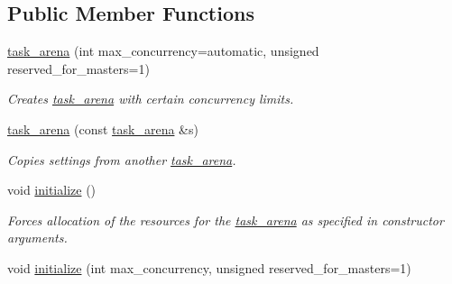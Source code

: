 \subsection*{Public Member Functions}
\begin{DoxyCompactItemize}
\item 
\hyperlink{classtbb_1_1interface7_1_1task__arena_a6035737ce1a8db376d06880dae9d0c40}{task\+\_\+arena} (int max\+\_\+concurrency=automatic, unsigned reserved\+\_\+for\+\_\+masters=1)
\begin{DoxyCompactList}\small\item\em Creates \hyperlink{classtbb_1_1interface7_1_1task__arena}{task\+\_\+arena} with certain concurrency limits. \end{DoxyCompactList}\item 
\hypertarget{classtbb_1_1interface7_1_1task__arena_a70d122b3e6e4760c6053c5c230c715ef}{}\hyperlink{classtbb_1_1interface7_1_1task__arena_a70d122b3e6e4760c6053c5c230c715ef}{task\+\_\+arena} (const \hyperlink{classtbb_1_1interface7_1_1task__arena}{task\+\_\+arena} \&s)\label{classtbb_1_1interface7_1_1task__arena_a70d122b3e6e4760c6053c5c230c715ef}

\begin{DoxyCompactList}\small\item\em Copies settings from another \hyperlink{classtbb_1_1interface7_1_1task__arena}{task\+\_\+arena}. \end{DoxyCompactList}\item 
\hypertarget{classtbb_1_1interface7_1_1task__arena_a955131a79f8dc5a0a5c9ffa66a7e7140}{}void \hyperlink{classtbb_1_1interface7_1_1task__arena_a955131a79f8dc5a0a5c9ffa66a7e7140}{initialize} ()\label{classtbb_1_1interface7_1_1task__arena_a955131a79f8dc5a0a5c9ffa66a7e7140}

\begin{DoxyCompactList}\small\item\em Forces allocation of the resources for the \hyperlink{classtbb_1_1interface7_1_1task__arena}{task\+\_\+arena} as specified in constructor arguments. \end{DoxyCompactList}\item 
\hypertarget{classtbb_1_1interface7_1_1task__arena_a754d60ba6981461eb7c86afd14d3da2a}{}void \hyperlink{classtbb_1_1interface7_1_1task__arena_a754d60ba6981461eb7c86afd14d3da2a}{initialize} (int max\+\_\+concurrency, unsigned reserved\+\_\+for\+\_\+masters=1)\label{classtbb_1_1interface7_1_1task__arena_a754d60ba6981461eb7c86afd14d3da2a}


\end{DoxyCompactItemize}
